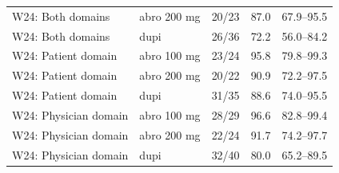 \begin{longtable}{llrrr}
W24: Both domains & abro 200 mg & 20/23 & 87.0 & 67.9--95.5 \\
W24: Both domains & dupi & 26/36 & 72.2 & 56.0--84.2 \\
W24: Patient domain & abro 100 mg & 23/24 & 95.8 & 79.8--99.3 \\
W24: Patient domain & abro 200 mg & 20/22 & 90.9 & 72.2--97.5 \\
W24: Patient domain & dupi & 31/35 & 88.6 & 74.0--95.5 \\
W24: Physician domain & abro 100 mg & 28/29 & 96.6 & 82.8--99.4 \\
W24: Physician domain & abro 200 mg & 22/24 & 91.7 & 74.2--97.7 \\
W24: Physician domain & dupi & 32/40 & 80.0 & 65.2--89.5 \\
\bottomrule\end{longtable}
